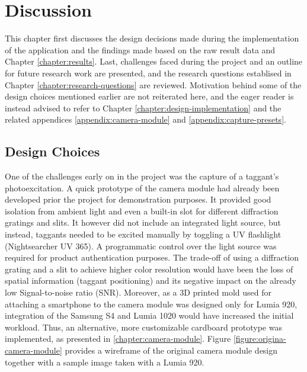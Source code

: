 \documentclass[thesis.tex]{subfiles}
\begin{document}
\chapter{Discussion}
\label{chapter:discussion}

This chapter first discusses the design decisions made during the implementation of the application and the findings made based on the raw result data and Chapter \ref{chapter:results}. Last, challenges faced during the project and an outline for future research work are presented, and the research questions establised in Chapter \ref{chapter:research-questions} are reviewed. Motivation behind some of the design choices mentioned earlier are not reiterated here, and the eager reader is instead advised to refer to Chapter \ref{chapter:design-implementation} and the related appendices \ref{appendix:camera-module} and \ref{appendix:capture-presets}.

\section{Design Choices}

One of the challenges early on in the project was the capture of a taggant's photoexcitation. A quick prototype of the camera module had already been developed prior the project for demonstration purposes. It provided good isolation from ambient light and even a built-in slot for different diffraction gratings and slits. It however did not include an integrated light source, but instead, taggants needed to be excited manually by toggling a UV flashlight (Nightsearcher UV 365). A programmatic control over the light source was required for product authentication purposes. The trade-off of using a diffraction grating and a slit to achieve higher color resolution would have been the loss of spatial information (taggant positioning) and its negative impact on the already low Signal-to-noise ratio (SNR). Moreover, as a 3D printed mold used for attaching a smartphone to the camera module was designed only for Lumia 920, integration of the Samsung S4 and Lumia 1020 would have increased the initial workload. Thus, an alternative, more customizable cardboard prototype was implemented, as presented in \ref{chapter:camera-module}. Figure \ref{figure:origina-camera-module} provides a wireframe of the original camera module design together with a sample image taken with a Lumia 920.
\end{document}
